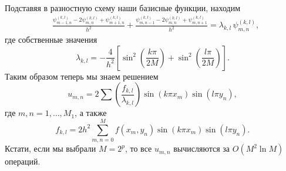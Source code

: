 Подставяя в разностную схему наши базисные функции, находим
\begin{align*}
	&\frac{\psi^{(k, l)}_{m-1,n} - 2 \psi^{(k, l)}_{m,n} + \psi^{(k, l)}_{m+1, n}}{h^2} + \frac{\psi^{(k, l)}_{m,n-1} - 2 \psi^{(k, l)}_{m,n} + \psi^{(k, l)}_{m, n+1}}{h^2} 
	=
	\lambda_{k,l}\,  \psi_{m,n}^{(k,l)},
\end{align*}
где собственные значения
\begin{equation}
	\lambda_{k, l} = - \frac{4}{h^2}\left[
		\sin^2\left(\frac{k \pi}{2M}\right) + \sin^2 \left(\frac{l \pi}{2 M}\right)
	\right].
\end{equation}
Таким образом теперь мы знаем решением
\begin{equation}
	u_{m,n} = 2 \sum \left(\frac{f_{k,l}}{\lambda_{k,l}}\right) 
	\sin\left(k \pi x_m\right) \sin\left(l \pi y_n\right),
\end{equation}
где $m,n = 1, \ldots, M_1$, а также
\begin{equation}
	f_{k,l} = 2 h^2 \sum_{m,n=0}^{M} f(x_m, y_n) 
	\sin(k \pi x_m) \sin(l \pi y_n).
\end{equation}
Кстати, если мы выбрали $M = 2^p$, то все $u_{m,n}$ вычисляются за $O(M^2 \ln M)$ операций. 

